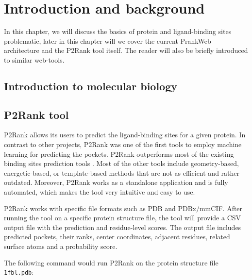 \chapter{Introduction and background}
\label{chap:refs}

In this chapter, we will discuss the basics of protein and ligand-binding sites problematic, later in this chapter will we cover the current PrankWeb architecture and the P2Rank tool itself. The reader will also be briefly introduced to similar web-tools.


\section{Introduction to molecular biology}


\section{P2Rank tool}

P2Rank allows its users to predict the ligand-binding sites for a given protein. In contrast to other projects, P2Rank was one of the first tools to employ machine learning for predicting the pockets. P2Rank outperforms most of the existing binding sites prediction tools \cite{krivak2018p2rank}. Most of the other tools include geometry-based, energetic-based, or template-based methods that are not as efficient and rather outdated. Moreover, P2Rank works as a standalone application and is fully automated, which makes the tool very intuitive and easy to use.

P2Rank works with specific file formats such as PDB and PDBx/mmCIF.  After running the tool on a specific protein structure file, the tool will provide a CSV output file with the prediction and residue-level scores. The output file includes predicted pockets, their ranks, center coordinates, adjacent residues, related surface atoms and a probability score.

The following command would run P2Rank on the protein structure file \texttt{1fbl.pdb}:

